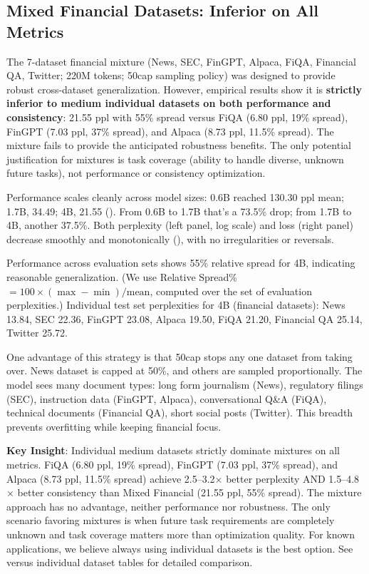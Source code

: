 \subsection{Mixed Financial Datasets: Inferior on All Metrics}

The 7-dataset financial mixture (News, SEC, FinGPT, Alpaca, FiQA, Financial QA, Twitter; 220M tokens; 50cap sampling policy) was designed to provide robust cross-dataset generalization. However, empirical results show it is \textbf{strictly inferior to medium individual datasets on both performance and consistency}: 21.55 ppl with 55\% spread versus FiQA (6.80 ppl, 19\% spread), FinGPT (7.03 ppl, 37\% spread), and Alpaca (8.73 ppl, 11.5\% spread). The mixture fails to provide the anticipated robustness benefits. The only potential justification for mixtures is task coverage (ability to handle diverse, unknown future tasks), not performance or consistency optimization.

Performance scales cleanly across model sizes: 0.6B reached 130.30 ppl mean; 1.7B, 34.49; 4B, 21.55 (). From 0.6B to 1.7B that's a 73.5\% drop; from 1.7B to 4B, another 37.5\%. Both perplexity (left panel, log scale) and loss (right panel) decrease smoothly and monotonically (), with no irregularities or reversals.

Performance across evaluation sets shows 55\% relative spread for 4B, indicating reasonable generalization. (We use Relative Spread\% $=100\times(\max-\min)/\text{mean}$, computed over the set of evaluation perplexities.) Individual test set perplexities for 4B (financial datasets): News 13.84, SEC 22.36, FinGPT 23.08, Alpaca 19.50, FiQA 21.20, Financial QA 25.14, Twitter 25.72.

One advantage of this strategy is that 50cap stops any one dataset from taking over. News dataset is capped at 50\%, and others are sampled proportionally. The model sees many document types: long form journalism (News), regulatory filings (SEC), instruction data (FinGPT, Alpaca), conversational Q\&A (FiQA), technical documents (Financial QA), short social posts (Twitter). This breadth prevents overfitting while keeping financial focus.

\textbf{Key Insight}: Individual medium datasets strictly dominate mixtures on all metrics. FiQA (6.80 ppl, 19\% spread), FinGPT (7.03 ppl, 37\% spread), and Alpaca (8.73 ppl, 11.5\% spread) achieve 2.5–3.2$\times$ better perplexity AND 1.5–4.8$\times$ better consistency than Mixed Financial (21.55 ppl, 55\% spread). The mixture approach has no advantage, neither performance nor robustness. The only scenario favoring mixtures is when future task requirements are completely unknown and task coverage matters more than optimization quality. For known applications, we believe always using individual datasets is the best option. See  versus individual dataset tables for detailed comparison.

